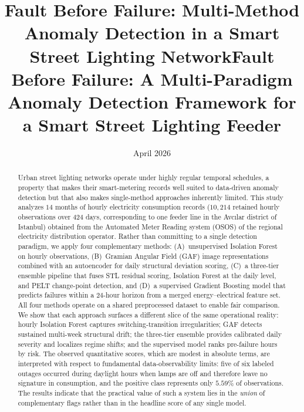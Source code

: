 \documentclass{article}
\title{Fault Before Failure: Multi-Method Anomaly Detection in a Smart Street Lighting Network}
\title{Fault Before Failure: A Multi-Paradigm Anomaly Detection Framework for a Smart Street Lighting Feeder}
\author{}
\date{April 2026}
\begin{document}
\maketitle

\begin{abstract}
Urban street lighting networks operate under highly regular temporal schedules, a property that makes their smart-metering records well suited to data-driven anomaly detection but that also makes single-method approaches inherently limited. This study analyzes $14$ months of hourly electricity consumption records ($10{,}214$ retained hourly observations over $424$ days, corresponding to one feeder line in the Avc{\i}lar district of Istanbul) obtained from the Automated Meter Reading system (OSOS) of the regional electricity distribution operator. Rather than committing to a single detection paradigm, we apply four complementary methods: (A)~unsupervised Isolation Forest on hourly observations, (B)~Gramian Angular Field (GAF) image representations combined with an autoencoder for daily structural deviation scoring, (C)~a three-tier ensemble pipeline that fuses STL residual scoring, Isolation Forest at the daily level, and PELT change-point detection, and (D)~a supervised Gradient Boosting model that predicts failures within a $24$-hour horizon from a merged energy--electrical feature set. All four methods operate on a shared preprocessed dataset to enable fair comparison. We show that each approach surfaces a different slice of the same operational reality: hourly Isolation Forest captures switching-transition irregularities; GAF detects sustained multi-week structural drift; the three-tier ensemble provides calibrated daily severity and localizes regime shifts; and the supervised model ranks pre-failure hours by risk. The observed quantitative scores, which are modest in absolute terms, are interpreted with respect to fundamental data-observability limits: five of six labeled outages occurred during daylight hours when lamps are off and therefore leave no signature in consumption, and the positive class represents only $5.59\%$ of observations. The results indicate that the practical value of such a system lies in the \emph{union} of complementary flags rather than in the headline score of any single model.

\end{abstract}
\end{document}

